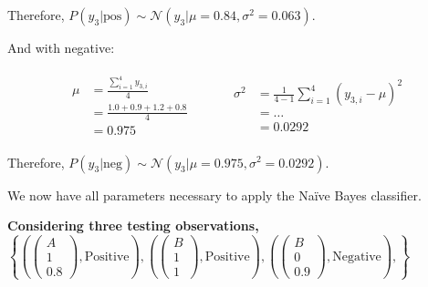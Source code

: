 \documentclass[12pt]{article}
\begin{document}
\begin{enumerate}[leftmargin=\labelsep,resume]
          Therefore, $P(y_3|\text{pos}) \sim \mathcal{N}(y_3 | \mu = 0.84, \sigma^2 = 0.063)$.

          And with negative:

          $$
              \begin{array}{c|c}
                  \begin{aligned}
                      \mu & = \frac{\sum^{4}_{i=1} y_{3,i}}{4} \\
                          & = \frac{1.0 + 0.9 + 1.2 + 0.8}{4}  \\
                          & = 0.975
                  \end{aligned}
                  \quad &
                  \quad
                  \begin{aligned}
                      \sigma^2 & = \frac{1}{4 - 1} \sum^4_{i=1} \left(y_{3,i} - \mu\right)^2 \\
                               & = \dots                                                     \\
                               & = 0.0292
                  \end{aligned}
              \end{array}
          $$

          Therefore, $P(y_3|\text{neg}) \sim \mathcal{N}(y_3 | \mu = 0.975, \sigma^2 = 0.0292)$.

          We now have all parameters necessary to apply the Naïve Bayes classifier.

\end{enumerate}

\vspace{3em}

{\bfseries
    Considering three testing observations,
    \(
    \left\{
    \left(
    \begin{pmatrix}
        A \\
        1 \\
        0.8
    \end{pmatrix},
    \text{Positive}
    \right),
    \left(
    \begin{pmatrix}
        B \\
        1 \\
        1
    \end{pmatrix},
    \text{Positive}
    \right),
    \left(
    \begin{pmatrix}
        B \\
        0 \\
        0.9
    \end{pmatrix},
    \text{Negative}
    \right),
    \right\}
    \)
}
\end{document}
